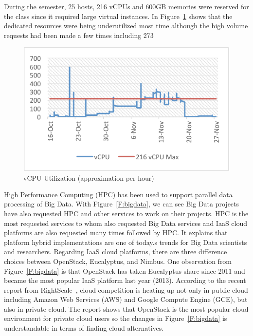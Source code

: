 \documentclass{sig-alternate}
\begin{document}
During the semester, 25 hosts, 216 vCPUs and 600GB memories were reserved for the class since it required large virtual instances. In Figure~\ref{F:fig6} shows that the dedicated resources were being underutilized most time although the high volume requests had been made a few times including 273%
  
\begin{figure}[h!] 
  \centering 
    \includegraphics[width=1.0\columnwidth]{images/fig5.pdf} 
  \caption{vCPU Utilization (approximation per hour)}\label{F:fig6} 
\end{figure} 

High Performance Computing (HPC) has been used to support parallel data processing of Big Data. With Figure~\ref{F:bigdata}, we can see Big Data projects have also requested HPC and other services to work on their projects. HPC is the most requested services to whom also requested Big Data services and IaaS cloud platforms are also requested many times followed by HPC. It explains that platform hybrid implementations are one of today.s trends for Big Data scientists and researchers. Regarding IaaS cloud platforms, there are three difference choices between OpenStack, Eucalyptus, and Nimbus. One observation from Figure~\ref{F:bigdata} is that OpenStack has taken Eucalyptus share since 2011 and became the most popular IaaS platform last year (2013). According to the recent report from RightScale~\cite{rightscalereport13}, cloud competition is heating up not only in public cloud including Amazon Web Services (AWS) and Google Compute Engine (GCE), but also in private cloud. The report shows that OpenStack is the most popular cloud environment for private cloud users so the changes in Figure~\ref{F:bigdata} is understandable in terms of finding cloud alternatives.
\end{document}
